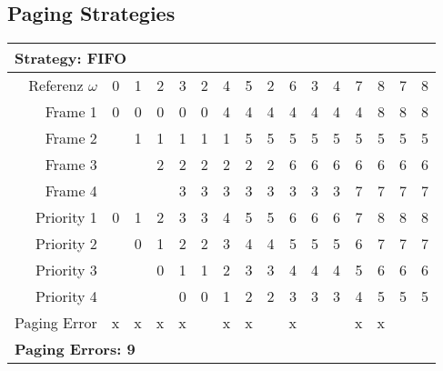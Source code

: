 \documentclass[a4paper, 11pt]{article}
\begin{document}
    \subsection{Paging Strategies}
    \setlength{\tabcolsep}{3.5mm}
      \renewcommand{\arraystretch}{1.2}
      \begin{center}
      \begin{tabular}{|r||r|r|r|r|r|r|r|r|r|r|r|r|r|r|r|}
      \multicolumn{16}{l}{\textbf{Strategy: FIFO}}\\
      \hline
            Referenz $\omega$ & 0 & 1 & 2 & 3 & 2 & 4 & 5 & 2 & 6 & 3 & 4 & 7 & 8 & 7 & 8 \\
      \hline\hline
            Frame 1    & 0  & 0  &0   & 0  & 0  & 4  & 4  &  4 & 4  & 4  & 4  & 4  & 8  & 8  & 8  \\\hline
            Frame 2    &    &  1 &  1 &  1 & 1  & 1  & 5  &  5 & 5  &5   & 5  & 5  & 5  & 5  & 5  \\\hline
            Frame 3    &    &    &  2 &  2 & 2  & 2  & 2  & 2  & 6  & 6  & 6  & 6  & 6  & 6  & 6  \\\hline
            Frame 4    &    &    &    &  3 &  3 & 3  & 3  & 3  & 3  & 3  & 3  & 7  & 7  & 7  & 7  \\
      \hline\hline
            Priority 1 & 0  & 1  & 2  & 3  & 3  & 4  & 5  & 5  & 6  & 6  & 6  & 7  & 8  & 8  & 8  \\\hline
            Priority 2 &    & 0  & 1  & 2  & 2  &  3 & 4  & 4  & 5  & 5  & 5  & 6  & 7  & 7  & 7  \\\hline
            Priority 3 &    &    & 0  & 1  & 1  & 2  & 3  & 3  & 4  & 4  & 4  & 5  & 6  & 6  & 6  \\\hline
            Priority 4 &    &    &    & 0  & 0  & 1  &2   &2   & 3  & 3  & 3  & 4  & 5  & 5  & 5  \\
      \hline\hline
            Paging Error  & x  & x  & x  & x  &   & x  & x  &   & x  &   &   & x  & x  &   &   \\
      \hline
      \multicolumn{16}{l}{\textbf{Paging Errors: 9}}\\
      \end{tabular}
      \end{center}

      \vfill
\end{document}
